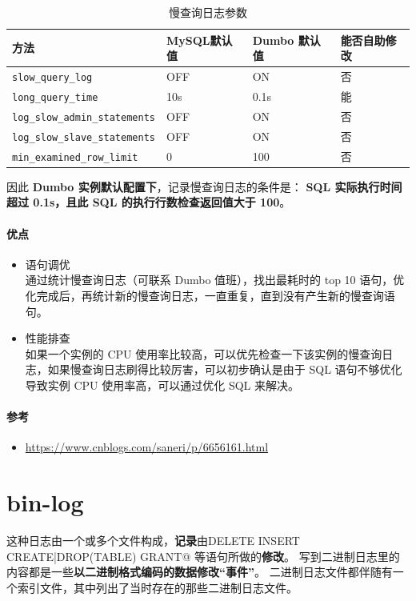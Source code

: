 \documentclass[UTF8,a4paper,12pt]{ctexbook}
\begin{document}
			\begin{table}[H]
				\centering
				\caption{慢查询日志参数}
				\begin{tabular}{p{5.5cm}<{\centering}|p{3cm}<{\centering}|p{3cm}<{\centering}|p{3cm}<{\centering}}
					\hline
						方法 &  MySQL默认值 &  Dumbo 默认值 & 能否自助修改\\
					\hline
				 \verb|slow_query_log| & OFF & ON &  否 \\
				 \verb|long_query_time| & 10s & 0.1s & 能 \\
				 \verb|log_slow_admin_statements| & OFF & ON & 否 \\
				 \verb|log_slow_slave_statements| & OFF & ON &否\\
				 \verb|min_examined_row_limit| & 0& 100 & 否 \\
					\hline
				\end{tabular}					
			\end{table}
			
			
			因此 \textbf{Dumbo 实例默认配置下}，记录慢查询日志的条件是：
			\textbf{SQL 实际执行时间超过 0.1s，且此 SQL 的执行行数检查返回值大于 100}。
		\paragraph{优点}
			\begin{itemize}
				\item 语句调优 \\ 通过统计慢查询日志（可联系 Dumbo 值班），找出最耗时的 top 10 语句，优化完成后，再统计新的慢查询日志，一直重复，直到没有产生新的慢查询语句。
				\item 性能排查 \\ 如果一个实例的 CPU 使用率比较高，可以优先检查一下该实例的慢查询日志，如果慢查询日志刷得比较厉害，可以初步确认是由于 SQL 语句不够优化导致实例 CPU 使用率高，可以通过优化 SQL 来解决。
			\end{itemize}
		
		\paragraph{参考}
			\begin{itemize}
				\item \url{https://www.cnblogs.com/saneri/p/6656161.html}
			\end{itemize}
			
	\section{bin-log}
		这种日志由一个或多个文件构成，\textbf{记录}由\verb@UPDATE DELETE INSERT CREATE|DROP(TABLE) GRANT@ 等语句所做的\textbf{修改}。
		写到二进制日志里的内容都是一些\textbf{以二进制格式编码的数据修改“事件”}。 二进制日志文件都伴随有一个索引文件，其中列出了当时存在的那些二进制日志文件。
		
\end{document}
